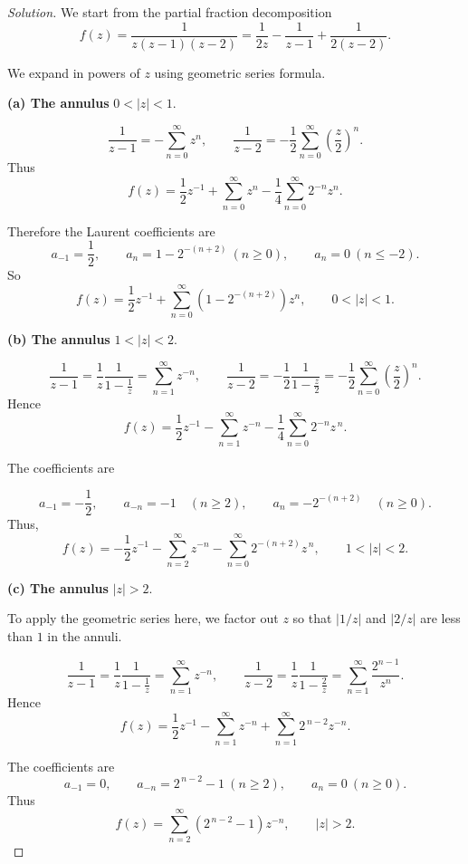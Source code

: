 \documentclass[12pt, a4paper]{report}
\theoremstyle{spaced}
\begin{document}
\begin{proof}[Solution]
	We start from the partial fraction decomposition
	\[
		f(z)=\frac{1}{z(z-1)(z-2)}
		= \frac{1}{2z}-\frac{1}{z-1}+\frac{1}{2(z-2)}.
	\]

	We expand in powers of $z$ using geometric series formula.

	\textbf{(a) The annulus } $0<|z|<1$.

	\[
		\frac{1}{z-1}
		= -\sum_{n=0}^{\infty} z^n,
		\qquad
		\frac{1}{z-2}
		= -\frac12 \sum_{n=0}^{\infty} \left(\frac{z}{2}\right)^n.
	\]
	Thus
	\[
		f(z)=\frac12 z^{-1}
		+ \sum_{n=0}^{\infty} z^n
		- \frac14 \sum_{n=0}^{\infty} 2^{-n} z^n.
	\]

	Therefore the Laurent coefficients are
	\[
		a_{-1}=\frac12,\qquad
		a_n = 1 - 2^{-(n+2)} \ (n\ge 0),\qquad
		a_n=0\ (n\le -2).
	\]
	So
	\[
		f(z)=\frac12 z^{-1}
		+ \sum_{n=0}^{\infty} \left(1-2^{-(n+2)}\right) z^{n},
		\qquad 0<|z|<1.
	\]


	\textbf{(b) The annulus } $1 < |z| < 2$.

	\[
		\frac{1}{z-1}
		= \frac{1}{z} \frac{1}{1-\frac{1}{z}}
		= \sum_{n=1}^{\infty} z^{-n},
		\qquad
		\frac{1}{z-2}
		= -\frac12 \frac{1}{1-\frac{z}{2}}
		= -\frac12 \sum_{n=0}^{\infty} \left(\frac{z}{2}\right)^n.
	\]
	Hence
	\[
		f(z)
		= \frac12 z^{-1}
		- \sum_{n=1}^{\infty} z^{-n}
		- \frac14 \sum_{n=0}^{\infty} 2^{-n} z^{\,n}.
	\]

	The coefficients are

	\[
		a_{-1}= -\frac12,
		\qquad
		a_{-n} = -1 \quad (n \ge 2),
		\qquad
		a_n = -2^{-(n+2)} \quad (n \ge 0).
	\]
	Thus,
	\[
		f(z)
		= -\frac12 z^{-1}
		- \sum_{n=2}^{\infty} z^{-n}
		- \sum_{n=0}^{\infty} 2^{-(n+2)}z^{\,n},
		\qquad 1<|z|<2.
	\]

	\textbf{(c) The annulus } $|z|>2$.

	To apply the geometric series here, we factor out $z$ so that $|1/z|$ and $|2/z|$ are less than $1$ in the annuli.


	\[
		\frac{1}{z-1} = \frac{1}{z} \frac{1}{1-\frac{1}{z}}
		= \sum_{n=1}^{\infty} z^{-n},
		\qquad
		\frac{1}{z-2}= \frac{1}{z} \frac{1}{1-\frac{2}{z}}
		= \sum_{n=1}^{\infty} \frac{2^{n-1}}{z^{n}}.
	\]
	Hence
	\[
		f(z)=\frac12 z^{-1}
		-\sum_{n=1}^{\infty} z^{-n}
		+ \sum_{n=1}^{\infty} 2^{\,n-2} z^{-n}.
	\]

	The coefficients are
	\[
		a_{-1}=0,
		\qquad
		a_{-n}=2^{\,n-2}-1 \ (n\ge 2),
		\qquad
		a_n=0 \ (n\ge 0).
	\]
	Thus
	\[
		f(z)=\sum_{n=2}^{\infty} \left(2^{\,n-2}-1\right) z^{-n},
		\qquad |z|>2.
	\]
\end{proof}
\end{document}
